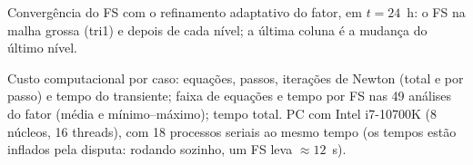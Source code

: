 \begin{table}[H]\centering\small
\caption{Convergência do FS com o refinamento adaptativo do fator, em $t = 24$~h: o FS na malha grossa (tri1) e
depois de cada nível; a última coluna é a mudança do último nível.}\label{tab:niveis}

\end{table}

\begin{table}[H]\centering\scriptsize\setlength{\tabcolsep}{3.5pt}
\caption{Custo computacional por caso: equações, passos, iterações de Newton (total e por passo) e tempo do
transiente; faixa de equações e tempo por FS nas 49 análises do fator (média e mínimo--máximo); tempo total. PC com
Intel i7-10700K (8 núcleos, 16 threads), com 18 processos seriais ao mesmo tempo (os tempos estão inflados pela
disputa: rodando sozinho, um FS leva $\approx 12$~s).}\label{tab:custo}

\end{table}


